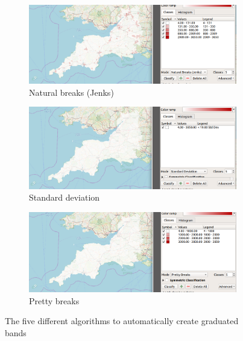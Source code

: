 \begin{figure}[h!]
	\medskip
	\begin{subfigure}{0.48\textwidth}
		\includegraphics[width=\linewidth]{images/mode_jenks.png}
		\caption{Natural breaks (Jenks)} \label{Natural breaks (Jenks)}
	\end{subfigure}\hspace*{\fill}
	\begin{subfigure}{0.48\textwidth}
		\includegraphics[width=\linewidth]{images/mode_stddev.png}
		\caption{Standard deviation} \label{Standard deviation}
	\end{subfigure}
	
	\medskip
	\begin{subfigure}{0.48\textwidth}
		\includegraphics[width=\linewidth]{images/mode_pretty.png}
		\caption{Pretty breaks} \label{Pretty breaks}
	\end{subfigure}\hspace*{\fill}
	
	\caption{The five different algorithms to automatically create graduated bands} \label{fig:1}
\end{figure}

